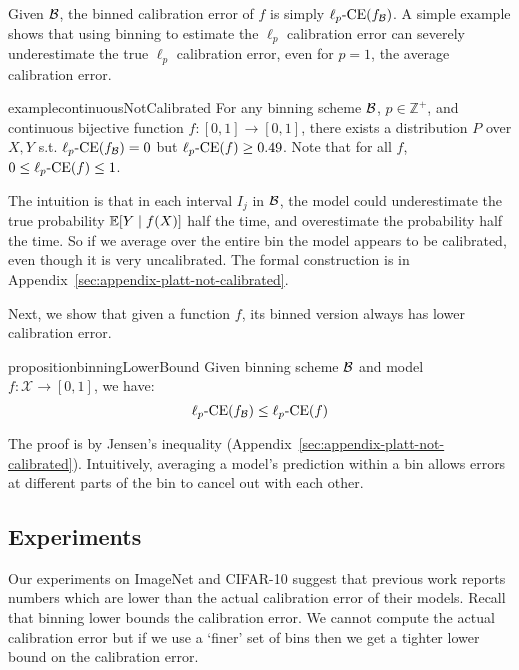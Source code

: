 Given $\mathcal{B}{}$, the binned calibration error of $f$ is simply $\ell_p\mbox{-CE}(f_{\mathcal{B}{}})$.
A simple example shows that using binning to estimate the $\ell_p$ calibration error can severely underestimate the true $\ell_p$ calibration error, even for $p=1$, the average calibration error.

\begin{restatable}{example}{continuousNotCalibrated}
\label{ex:continuous-not-calibrated}
For any binning scheme $\mathcal{B}{}$, $p \in \mathbb{Z}^+$, and continuous bijective function $f : [0, 1] \to [0, 1]$, there exists a distribution $P$ over $X, Y$ s.t. $\ell_p\mbox{-CE}(f_{\mathcal{B}{}}) = 0$ but $\ell_p\mbox{-CE}(f) \geq 0.49$.
Note that for all $f$, $0 \leq \ell_p\mbox{-CE}(f) \leq 1$.
\end{restatable}

The intuition is that in each interval $I_j$ in $\mathcal{B}{}$, the model could underestimate the true probability $\mathbb{E}[Y \mid f(X)]$ half the time, and overestimate the probability half the time. So if we average over the entire bin the model appears to be calibrated, even though it is very uncalibrated. The formal construction is in Appendix~\ref{sec:appendix-platt-not-calibrated}.

Next, we show that given a function $f$, its binned version always has lower calibration error.

\begin{restatable}{proposition}{binningLowerBound}
\label{prop:bin_low_bound}
  Given binning scheme $\mathcal{B}{}$ and model $f : \mathcal{X} \to [0, 1]$, we have:
\[  \ell_p\mbox{-CE}(f_{\mathcal{B}{}}) \leq \ell_p\mbox{-CE}(f) \]
\end{restatable}

The proof is by Jensen's inequality (Appendix~\ref{sec:appendix-platt-not-calibrated}). Intuitively, averaging a model's prediction within a bin allows errors at different parts of the bin to cancel out with each other. 

\subsection{Experiments}

Our experiments on ImageNet and CIFAR-10 suggest that previous work reports numbers which are lower than the actual calibration error of their models. Recall that binning lower bounds the calibration error. We cannot compute the actual calibration error but if we use a `finer' set of bins then we get a tighter lower bound on the calibration error.

